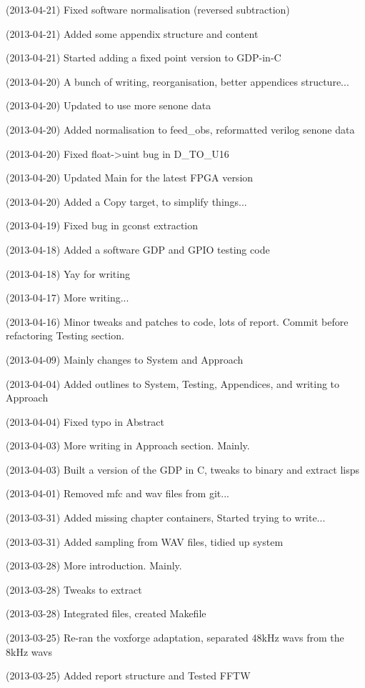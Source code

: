 (2013-04-21) Fixed software normalisation (reversed subtraction)

(2013-04-21) Added some appendix structure and content

(2013-04-21) Started adding a fixed point version to GDP-in-C

(2013-04-20) A bunch of writing, reorganisation, better appendices structure...

(2013-04-20) Updated to use more senone data

(2013-04-20) Added normalisation to feed\_obs, reformatted verilog senone data

(2013-04-20) Fixed float->uint bug in D\_TO\_U16

(2013-04-20) Updated Main for the latest FPGA version

(2013-04-20) Added a Copy target, to simplify things...

(2013-04-19) Fixed bug in gconst extraction

(2013-04-18) Added a software GDP and GPIO testing code

(2013-04-18) Yay for writing

(2013-04-17) More writing...

(2013-04-16) Minor tweaks and patches to code, lots of report. Commit before refactoring Testing section.

(2013-04-09) Mainly changes to System and Approach

(2013-04-04) Added outlines to System, Testing, Appendices, and writing to Approach

(2013-04-04) Fixed typo in Abstract

(2013-04-03) More writing in Approach section. Mainly.

(2013-04-03) Built a version of the GDP in C, tweaks to binary and extract lisps

(2013-04-01) Removed mfc and wav files from git...

(2013-03-31) Added missing chapter containers, Started trying to write...

(2013-03-31) Added sampling from WAV files, tidied up system

(2013-03-28) More introduction. Mainly.

(2013-03-28) Tweaks to extract

(2013-03-28) Integrated files, created Makefile

(2013-03-25) Re-ran the voxforge adaptation, separated 48kHz wavs from the 8kHz wavs

(2013-03-25) Added report structure and Tested FFTW

